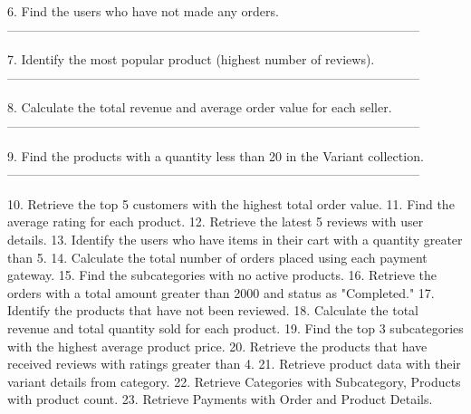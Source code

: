6. Find the users who have not made any orders.
--------------------------------------------------------------------------------------------------

7. Identify the most popular product (highest number of reviews).
--------------------------------------------------------------------------------------------------

8. Calculate the total revenue and average order value for each seller.
--------------------------------------------------------------------------------------------------

9. Find the products with a quantity less than 20 in the Variant collection.
--------------------------------------------------------------------------------------------------

10. Retrieve the top 5 customers with the highest total order value.
11. Find the average rating for each product.
12. Retrieve the latest 5 reviews with user details.
13. Identify the users who have items in their cart with a quantity greater than 5.
14. Calculate the total number of orders placed using each payment gateway.
15. Find the subcategories with no active products.
16. Retrieve the orders with a total amount greater than 2000 and status as "Completed."
17. Identify the products that have not been reviewed.
18. Calculate the total revenue and total quantity sold for each product.
19. Find the top 3 subcategories with the highest average product price.
20. Retrieve the products that have received reviews with ratings greater than 4.
21. Retrieve product data with their variant details from category.
22. Retrieve Categories with Subcategory, Products with product count.
23. Retrieve Payments with Order and Product Details.